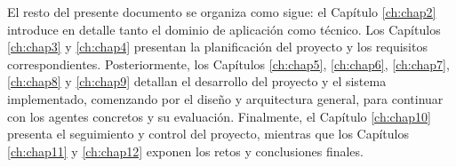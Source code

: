 El resto del presente documento se organiza como sigue: el Capítulo \ref{ch:chap2} introduce en detalle tanto el dominio de aplicación como técnico. Los Capítulos \ref{ch:chap3} y \ref{ch:chap4} presentan la planificación del proyecto y los requisitos correspondientes. Posteriormente, los Capítulos \ref{ch:chap5}, \ref{ch:chap6}, \ref{ch:chap7}, \ref{ch:chap8} y \ref{ch:chap9} detallan el desarrollo del proyecto y el sistema implementado, comenzando por el diseño y arquitectura general, para continuar con los agentes concretos y su evaluación. Finalmente, el Capítulo \ref{ch:chap10} presenta el seguimiento y control del proyecto, mientras que los Capítulos \ref{ch:chap11} y \ref{ch:chap12} exponen los retos y conclusiones finales.
